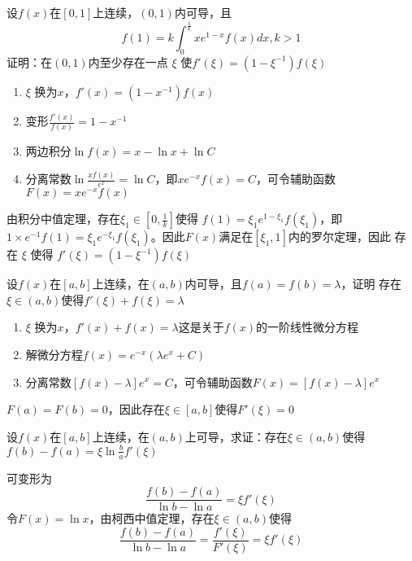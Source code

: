\documentclass{article}
\begin{document}
\begin{examplle}[]
设\(f(x)\)在\([0,1]\)上连续，\((0,1)\)内可导，且
\begin{equation*}
f(1)=k\int_0^{\frac{1}{k}}xe^{1-x}f(x)dx,k>1
\end{equation*}
证明：在\((0,1)\)内至少存在一点 \(\xi\) 使\(f'(\xi)=(1-\xi^{-1})f(\xi)\)

\begin{enumerate}
\item \(\xi\) 换为\(x\)，\(f'(x)=(1-x^{-1})f(x)\)
\item 变形\(\frac{f'(x)}{f(x)}=1-x^{-1}\)
\item 两边积分\(\ln f(x)=x-\ln x+ \ln C\)
\item 分离常数\(\ln\frac{xf(x)}{e^x}=\ln C\)，即\(xe^{-x}f(x)=C\)，可令辅助函数
\(F(x)=xe^{-x}f(x)\)
\end{enumerate}


由积分中值定理，存在\(\xi_1\in[0,\frac{1}{k}]\)使得
\(f(1)=\xi_1e^{1-\xi_1}f(\xi_1)\)，即\(1\times e^{-1}f(1)=\xi_1
  e^{-\xi_1}f(\xi_1)\)。因此\(F(x)\)满足在\([\xi_1,1]\)内的罗尔定理，因此
存在 \(\xi\) 使得 \(f'(\xi)=(1-\xi^{-1})f(\xi)\)
\end{examplle}

\begin{examplle}[]
设\(f(x)\)在\([a,b]\)上连续，在\((a,b)\)内可导，且\(f(a)=f(b)=\lambda\)，证明
存在\(\xi\in(a,b)\)使得\(f'(\xi)+f(\xi)=\lambda\)

\begin{enumerate}
\item \(\xi\) 换为\(x\)，\(f'(x)+f(x)=\lambda\)这是关于\(f(x)\)的一阶线性微分方程
\item 解微分方程\(f(x)=e^{-x}(\lambda e^x+C)\)
\item 分离常数\([f(x)-\lambda]e^x=C\)，可令辅助函数\(F(x)=[f(x)-\lambda]e^x\)
\end{enumerate}


\(F(a)=F(b)=0\)，因此存在\(\xi\in[a,b]\)使得\(F'(\xi)=0\)
\end{examplle}

\begin{examplle}[]
设\(f(x)\)在\([a,b]\)上连续，在\((a,b)\)上可导，求证：存在\(\xi\in(a,b)\)使得
\(f(b)-f(a)=\xi\ln\frac{b}{a}f'(\xi)\)

可变形为
\begin{equation*}
\frac{f(b)-f(a)}{\ln b-\ln a}=\xi f'(\xi)
\end{equation*}
令\(F(x)=\ln x\)，由柯西中值定理，存在\(\xi\in(a,b)\)使得
\begin{equation*}
\frac{f(b)-f(a)}{\ln b-\ln a}=\frac{f'(\xi)}{F'(\xi)}=\xi f'(\xi)
\end{equation*}
\end{examplle}
\end{document}

